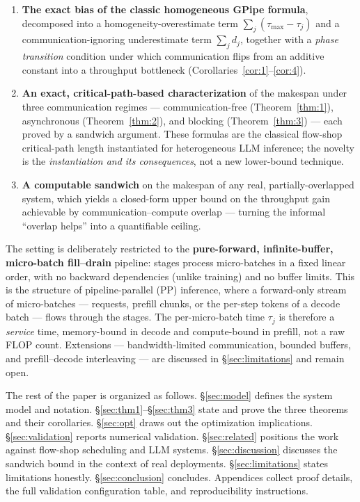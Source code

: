 \documentclass[11pt]{article}
\begin{document}
\begin{enumerate}
\item \textbf{The exact bias of the classic homogeneous GPipe formula}, decomposed into a homogeneity-overestimate term $\sum_j(\tau_{\max}-\tau_j)$ and a communication-ignoring underestimate term $\sum_j d_j$, together with a \emph{phase transition} condition under which communication flips from an additive constant into a throughput bottleneck (Corollaries~\ref{cor:1}--\ref{cor:4}).
\item \textbf{An exact, critical-path-based characterization} of the makespan under three communication regimes --- communication-free (Theorem~\ref{thm:1}), asynchronous (Theorem~\ref{thm:2}), and blocking (Theorem~\ref{thm:3}) --- each proved by a sandwich argument. These formulas are the classical flow-shop critical-path length instantiated for heterogeneous LLM inference; the novelty is the \emph{instantiation and its consequences}, not a new lower-bound technique.
\item \textbf{A computable sandwich} on the makespan of any real, partially-overlapped system, which yields a closed-form upper bound on the throughput gain achievable by communication--compute overlap --- turning the informal ``overlap helps'' into a quantifiable ceiling.
\end{enumerate}

The setting is deliberately restricted to the \textbf{pure-forward, infinite-buffer, micro-batch fill--drain} pipeline: stages process micro-batches in a fixed linear order, with no backward dependencies (unlike training) and no buffer limits. This is the structure of pipeline-parallel (PP) inference, where a forward-only stream of micro-batches --- requests, prefill chunks, or the per-step tokens of a decode batch --- flows through the stages. The per-micro-batch time $\tau_j$ is therefore a \emph{service} time, memory-bound in decode and compute-bound in prefill, not a raw FLOP count. Extensions --- bandwidth-limited communication, bounded buffers, and prefill--decode interleaving --- are discussed in \S\ref{sec:limitations} and remain open.

The rest of the paper is organized as follows. \S\ref{sec:model} defines the system model and notation. \S\ref{sec:thm1}--\S\ref{sec:thm3} state and prove the three theorems and their corollaries. \S\ref{sec:opt} draws out the optimization implications. \S\ref{sec:validation} reports numerical validation. \S\ref{sec:related} positions the work against flow-shop scheduling and LLM systems. \S\ref{sec:discussion} discusses the sandwich bound in the context of real deployments. \S\ref{sec:limitations} states limitations honestly. \S\ref{sec:conclusion} concludes. Appendices collect proof details, the full validation configuration table, and reproducibility instructions.
\end{document}
